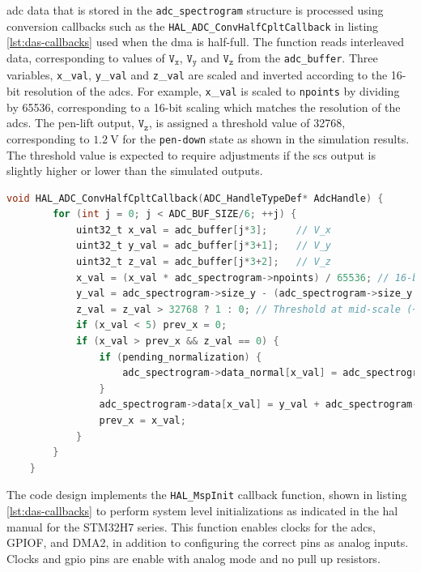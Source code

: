 \documentclass[class=report,11pt,crop=false]{standalone}
\begin{document}
	\acrshort{adc} data that is stored in the \texttt{adc\_spectrogram} structure is processed using conversion callbacks such as the \texttt{HAL\_ADC\_ConvHalfCpltCallback} in listing \ref{lst:das-callbacks} used when the \acrshort{dma} is half-full. The function reads interleaved data, corresponding to values of $\texttt{V}_\texttt{x}$, $\texttt{V}_\texttt{y}$ and $\texttt{V}_\texttt{z}$ from the \texttt{adc\_buffer}. Three variables, \texttt{x}\_\texttt{val}, \texttt{y}\_\texttt{val} and \texttt{z}\_\texttt{val} are scaled and inverted according to the 16-bit resolution of the \acrshort{adc}s. For example, \texttt{x}\_\texttt{val} is scaled to \texttt{npoints} by dividing by 65536, corresponding to a 16-bit scaling which matches the resolution of the \acrshort{adc}s. The pen-lift output, $\texttt{V}_\texttt{z}$, is assigned a threshold value of 32768, corresponding to $\SI{1.2}{\volt}$ for the \texttt{pen-down} state as shown in the simulation results. The threshold value is expected to require adjustments if the \acrshort{scs} output is slightly higher or lower than the simulated outputs. 
	\begin{lstlisting}[language=C, label={lst:das-callbacks}, caption={Showing conversion callbacks for processing \acrshort{adc} data when the \acrshort{dma} fills half.}]
	void HAL_ADC_ConvHalfCpltCallback(ADC_HandleTypeDef* AdcHandle) {
		for (int j = 0; j < ADC_BUF_SIZE/6; ++j) {
			uint32_t x_val = adc_buffer[j*3];     // V_x
			uint32_t y_val = adc_buffer[j*3+1];   // V_y
			uint32_t z_val = adc_buffer[j*3+2];   // V_z
			x_val = (x_val * adc_spectrogram->npoints) / 65536; // 16-bit scaling
			y_val = adc_spectrogram->size_y - (adc_spectrogram->size_y * y_val) / 65536;
			z_val = z_val > 32768 ? 1 : 0; // Threshold at mid-scale (~1.65 V)
			if (x_val < 5) prev_x = 0;
			if (x_val > prev_x && z_val == 0) {
				if (pending_normalization) {
					adc_spectrogram->data_normal[x_val] = adc_spectrogram->size_y/2 - y_val;
				}
				adc_spectrogram->data[x_val] = y_val + adc_spectrogram->data_normal[x_val];
				prev_x = x_val;
			}
		}
	}
	\end{lstlisting}
	The code design implements the \texttt{HAL\_MspInit} callback function, shown in listing \ref{lst:das-callbacks} to perform system level initializations as indicated in the \acrshort{hal} manual for the STM32H7 series. This function enables clocks for the \acrshort{adc}s, GPIOF, and DMA2, in addition to configuring the correct pins as analog inputs. Clocks and \acrshort{gpio} pins are enable with analog mode and no pull up resistors. 
\end{document}
